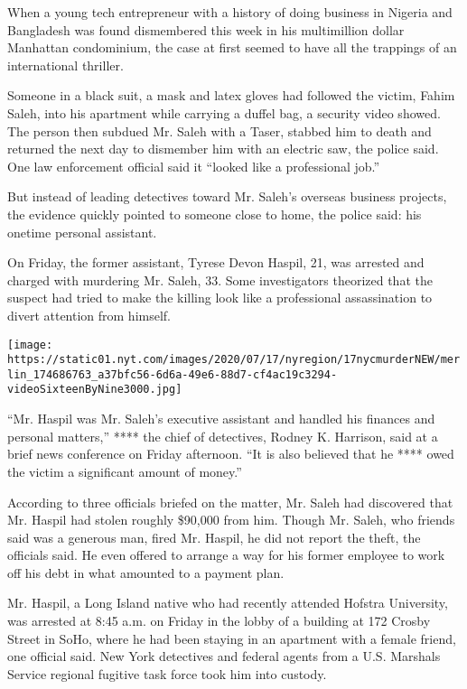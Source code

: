 When a young tech entrepreneur with a history of doing business in
Nigeria and Bangladesh was found dismembered this week in his
multimillion dollar Manhattan condominium, the case at first seemed to
have all the trappings of an international thriller.

Someone in a black suit, a mask and latex gloves had followed the
victim, Fahim Saleh, into his apartment while carrying a duffel bag, a
security video showed. The person then subdued Mr. Saleh with a Taser,
stabbed him to death and returned the next day to dismember him with an
electric saw, the police said. One law enforcement official said it
``looked like a professional job.''

But instead of leading detectives toward Mr. Saleh's overseas business
projects, the evidence quickly pointed to someone close to home, the
police said: his onetime personal assistant.

On Friday, the former assistant, Tyrese Devon Haspil, 21, was arrested
and charged with murdering Mr. Saleh, 33. Some investigators theorized
that the suspect had tried to make the killing look like a professional
assassination to divert attention from himself.

\texttt{[image: https://static01.nyt.com/images/2020/07/17/nyregion/17nycmurderNEW/merlin\_174686763\_a37bfc56-6d6a-49e6-88d7-cf4ac19c3294-videoSixteenByNine3000.jpg]}

``Mr. Haspil was Mr. Saleh's executive assistant and handled his
finances and personal matters,'' **** the chief of detectives, Rodney K.
Harrison, said at a brief news conference on Friday afternoon. ``It is
also believed that he **** owed the victim a significant amount of
money.''

According to three officials briefed on the matter, Mr. Saleh had
discovered that Mr. Haspil had stolen roughly \$90,000 from him. Though
Mr. Saleh, who friends said was a generous man, fired Mr. Haspil, he did
not report the theft, the officials said. He even offered to arrange a
way for his former employee to work off his debt in what amounted to a
payment plan.

Mr. Haspil, a Long Island native who had recently attended Hofstra
University, was arrested at 8:45 a.m. on Friday in the lobby of a
building at 172 Crosby Street in SoHo, where he had been staying in an
apartment with a female friend, one official said. New York detectives
and federal agents from a U.S. Marshals Service regional fugitive task
force took him into custody.

